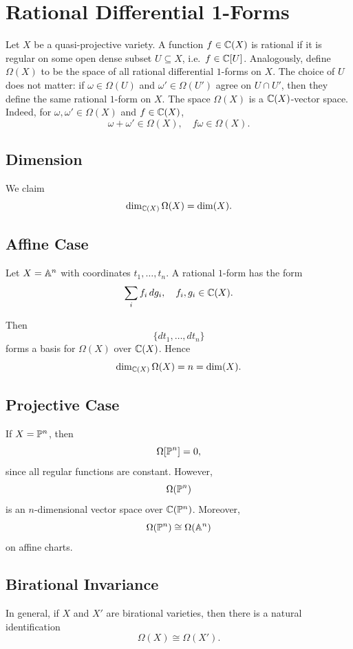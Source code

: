 
\section{Rational Differential 1-Forms}

Let $X$ be a quasi-projective variety.
A function $f \in \c(X)$ is rational if it is regular on some open dense subset $U \subseteq X$, i.e.\ $f \in \c[U]$.
Analogously, define $\Omega(X)$ to be the space of all rational differential $1$-forms on $X$.
The choice of $U$ does not matter:
if $\omega \in \Omega(U)$ and $\omega' \in \Omega(U')$ agree on $U \cap U'$, then they define the same rational $1$-form on $X$.
The space $\Omega(X)$ is a $\c(X)$-vector space.
Indeed, for $\omega, \omega' \in \Omega(X)$ and $f \in \c(X)$,
\[
    \omega + \omega' \in \Omega(X),
    \quad
    f\omega \in \Omega(X).
\]

\subsection*{Dimension}

We claim
\[
    \dim_{\c(X)} \Omega(X) = \dim(X).
\]

\subsection*{Affine Case}

Let $X = \aa^n$ with coordinates $t_1,\ldots,t_n$.
A rational $1$-form has the form
\[
    \sum_i f_i \, d g_i,
    \quad
    f_i, g_i \in \c(X).
\]

Then
\[
    \{dt_1,\ldots,dt_n\}
\]
forms a basis for $\Omega(X)$ over $\c(X)$.
Hence
\[
    \dim_{\c(X)} \Omega(X) = n = \dim(X).
\]

\subsection*{Projective Case}

If $X = \pp^n$, then
\[
    \Omega[\pp^n] = 0,
\]
since all regular functions are constant.
However,
\[
    \Omega(\pp^n)
\]
is an $n$-dimensional vector space over $\c(\pp^n)$.
Moreover,
\[
    \Omega(\pp^n) \cong \Omega(\aa^n)
\]
on affine charts.

\subsection*{Birational Invariance}

In general, if $X$ and $X'$ are birational varieties, then there is a natural identification
\[
    \Omega(X) \cong \Omega(X').
\]